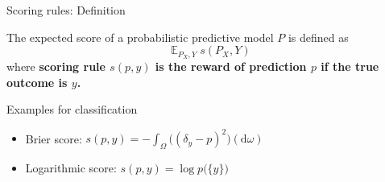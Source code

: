 \documentclass[aspectratio=169,hyperref={pdfpagelabels=false,pageanchor=false,bookmarks=false}]{beamer}
\newcommand\hl[1]{\begingroup\bfseries\boldmath\color{red}#1\endgroup}
\begin{document}
\begin{frame}{Scoring rules: Definition}
  \begin{definition}
    The expected score of a probabilistic predictive model $P$ is defined as
    \begin{equation*}
      \operatorname{\mathbb{E}}_{P_X, Y} s(P_X, Y)
    \end{equation*}
    where \hl{scoring rule $s(p, y)$} is the reward of prediction $p$ if the true outcome is $y$.
  \end{definition}
  \pause
  \begin{block}{Examples for classification}
    \begin{itemize}
      \item Brier score: $s(p, y) = - \int_{\Omega} \big((\delta_{y} - p)^2\big)(\mathrm{d}\omega)$
      \item Logarithmic score: $s(p, y) = \log p\big(\{y\}\big)$
    \end{itemize}
  \end{block}
\end{frame}
\end{document}
